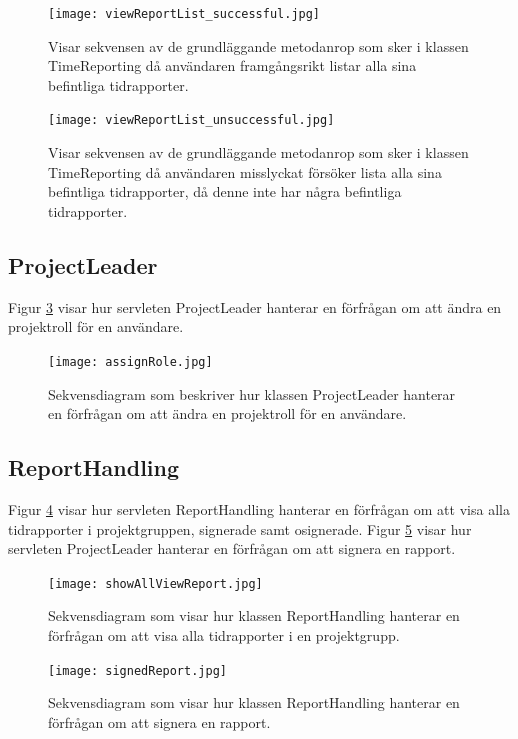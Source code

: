 \documentclass[a4paper]{article}
\begin{document}
\begin{figure}[h!]
\centering
\texttt{[image: viewReportList\_successful.jpg]}
\caption{Visar sekvensen av de grundläggande metodanrop som sker i klassen TimeReporting då användaren framgångsrikt listar alla sina befintliga tidrapporter.
\label{viewReportList}}
\end{figure}

\begin{figure}[h!]
\centering
\texttt{[image: viewReportList\_unsuccessful.jpg]}
\caption{Visar sekvensen av de grundläggande metodanrop som sker i klassen TimeReporting då användaren misslyckat försöker lista alla sina befintliga tidrapporter, då denne inte har några befintliga tidrapporter.
\label{viewReportListFail}}
\end{figure}


\subsection{ProjectLeader}
Figur \ref{assignRole} visar hur servleten ProjectLeader hanterar en förfrågan om att ändra en projektroll för en användare.

\begin{figure}[h!]
\centering
\texttt{[image: assignRole.jpg]}
\caption{Sekvensdiagram som beskriver hur klassen ProjectLeader hanterar en förfrågan om att ändra en projektroll för en användare.
\label{assignRole}}
\end{figure}

\subsection{ReportHandling}

Figur \ref{showAllViewReport} visar hur servleten ReportHandling hanterar en förfrågan om att visa alla tidrapporter i projektgruppen, signerade samt osignerade. Figur \ref{signedReport} visar hur servleten ProjectLeader hanterar en förfrågan om att signera en rapport.

\begin{figure}[h!]
\centering
\texttt{[image: showAllViewReport.jpg]}
\caption{Sekvensdiagram som visar hur klassen ReportHandling hanterar en förfrågan om att visa alla tidrapporter i en projektgrupp.
\label{showAllViewReport}}
\end{figure}

\begin{figure}[h!]
\centering
\texttt{[image: signedReport.jpg]}
\caption{Sekvensdiagram som visar hur klassen ReportHandling hanterar en förfrågan om att signera en rapport.
\label{signedReport}}
\end{figure}
\end{document}

